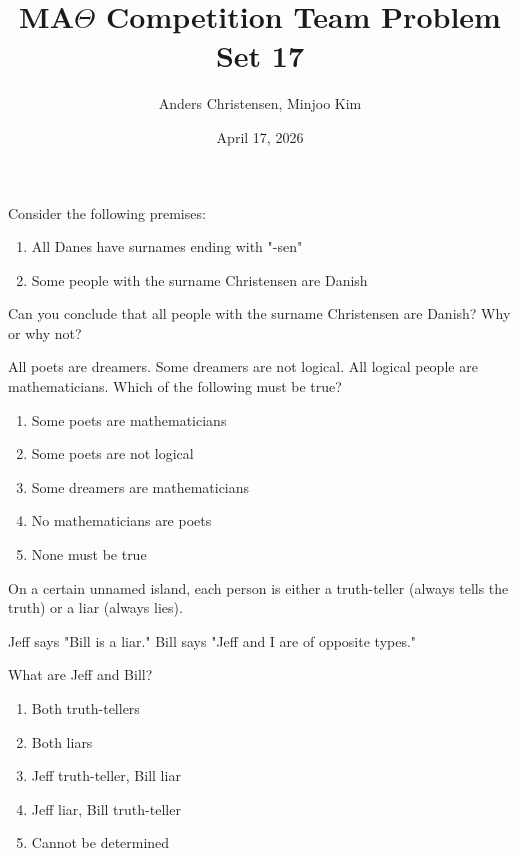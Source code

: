 \documentclass[12pt]{article}
\newenvironment{problem}[2][Problem]{\begin{trivlist}
\item[\hskip \labelsep {\bfseries #1}\hskip \labelsep {\bfseries #2.}]}{\end{trivlist}}
\begin{document}
\title{MA$\Theta$ Competition Team  Problem Set 17}
\author{Anders Christensen, Minjoo Kim}
\date{April 17, 2026}

\maketitle

\begin{problem}{1}
Consider the following premises:

\begin{enumerate}[label=\Roman*.]
  \item All Danes have surnames ending with "-sen"
  \item Some people with the surname Christensen are Danish
\end{enumerate}
Can you conclude that all people with the surname Christensen are Danish? Why or why not?
\end{problem}
\begin{problem}{2}
All poets are dreamers. Some dreamers are not logical. All logical people are mathematicians. Which of the following must be true?
\begin{enumerate}[label=\Roman*.]
  \item Some poets are mathematicians
  \item Some poets are not logical
  \item Some dreamers are mathematicians
  \item No mathematicians are poets
  \item None must be true
\end{enumerate}
\end{problem}
\begin{problem}{3}
On a certain unnamed island, each person is either a truth-teller (always tells the truth) or a liar (always lies).

Jeff says "Bill is a liar."
Bill says "Jeff and I are of opposite types."

What are Jeff and Bill?
\begin{enumerate}[label=\Roman*.]
  \item Both truth-tellers
  \item Both liars
  \item Jeff truth-teller, Bill liar
  \item Jeff liar, Bill truth-teller
  \item Cannot be determined
\end{enumerate}
\end{problem}
\end{document}

